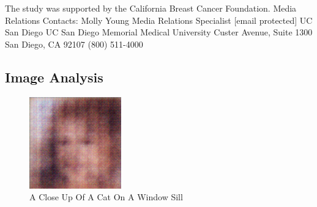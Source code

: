 \documentclass{article}%
\begin{document}
The study was supported by the California Breast Cancer Foundation.\newline%
Media Relations Contacts:\newline%
Molly Young\newline%
Media Relations Specialist\newline%
{[}email protected{]}\newline%
UC San Diego\newline%
UC San Diego Memorial Medical University Custer Avenue, Suite 1300\newline%
San Diego, CA 92107\newline%
(800) 511{-}4000

%
\subsection{Image Analysis}%
\label{subsec:ImageAnalysis}%


\begin{figure}[h!]%
\centering%
\includegraphics[width=150px]{500_fake_images/samples_5_447.png}%
\caption{A Close Up Of A Cat On A Window Sill}%
\end{figure}

%
\end{document}
